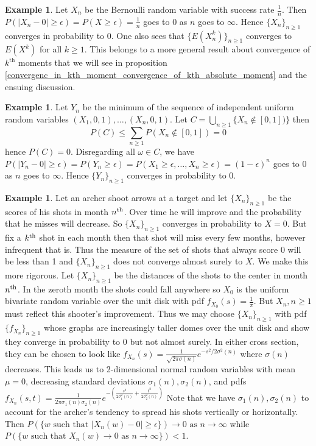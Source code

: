 \documentclass[12pt]{amsart}
\theoremstyle{definition}
\newtheorem{example}[theorem]{Example}
\begin{document}
\begin{example} \label{convergence_in_probability_1} Let $X_n$ be the Bernoulli random variable with success rate $\frac{1}{n}$.  Then $P(|X_n - 0| \geq \epsilon) = P(X \geq \epsilon) = \frac{1}{n}$ goes to 0 as $n$ goes to $\infty$. Hence $\{X_n\}_{n \geq 1}$ converges in probability to $0$. One also sees that $\{E(X_n^k)\}_{n \geq 1}$ converges to $E(X^k)$ for all $k \geq 1$. This belongs to a more general result about convergence of $k^{\text{th}}$ moments that we will see in proposition \ref{convergenc_in_kth_moment_convergence_of_kth_absolute_moment} and the ensuing discussion.
\end{example}
\begin{example} \label{convergence_in_probability_2} Let $Y_n$ be the minimum of the sequence of independent uniform random variables $(X_1, 0, 1), \dots , (X_n, 0, 1)$. Let $C = \bigcup\limits_{n \geq 1} \{X_n \nin [0,1])\}$ then
$$P(C) \leq \sum\limits_{n \geq 1} P(X_n \nin [0,1]) = 0$$
hence $P(C) = 0$. Disregarding all $\omega \in C$, we have $P(|Y_n - 0| \geq \epsilon) = P(Y_n \geq \epsilon) = P(X_1 \geq \epsilon, \dots , X_n \geq \epsilon) = (1-\epsilon)^n$ goes to $0$ as $n$ goes to $\infty$. Hence $\{Y_n\}_{n \geq 1}$ converges in probability to 0.
\end{example}
\begin{example} \label{archer} Let  an archer shoot arrows at a target and let $\{X_n\}_{n \geq 1}$ be the scores of his shots in month $n^{\textnormal{th}}$. Over time he will improve and the probability that he misses will decrease. So $\{X_n\}_{n \geq 1}$ converges in probability to $X = 0$. But fix a $k^{\textnormal{th}}$ shot in each month then that shot will miss every few months, however infrequent that is. Thus the measure of the set of shots that always score 0 will be less than 1 and $\{X_n\}_{n \geq 1}$ does not converge almost surely to $X$. We make this more rigorous. Let $\{X_n\}_{n \geq 1}$ be the distances of the shots to the center in month $n^{\textnormal{th}}$. In the zeroth month the shots could fall anywhere so $X_0$ is the uniform bivariate random variable over the unit disk with pdf $f_{X_0}(s) = \frac{1}{\pi}$. But $X_n, n \geq 1$ must reflect this shooter's improvement. Thus we may choose $\{X_n\}_{n \geq 1}$ with pdf $\{f_{X_n}\}_{n \geq 1}$ whose graphs are increasingly taller domes over the unit disk and show they converge in probability to 0 but not almost surely. In either cross section, they can be chosen to look like $f_{X_n}(s) = \frac{1}{\sqrt{2\pi\sigma(n)}}e^{- s^2/2\sigma^2(n)}$ where $\sigma(n)$ decreases. This leads us to 2-dimensional normal random variables with mean $\mu = 0$,  decreasing standard deviations $\sigma_1(n), \sigma_2(n)$, and pdfs $f_{X_n} (s, t) = \frac{1}{2\pi\sigma_1(n)\sigma_2(n)}e^{- \left( \frac{s^2}{2\sigma_1^2(n)} + \frac{t^2}{2\sigma_2^2(n)} \right)}$  Note that we have $\sigma_1(n), \sigma_2(n)$ to account for the archer's tendency to spread his shots vertically or horizontally. Then $P(\{w \text{ such that } |X_n(w) - 0| \geq \epsilon \} ) \rightarrow 0 \text{ as } n \rightarrow \infty$ while $P(\{w \text{ such that } X_n(w) \rightarrow 0 \text{ as } n \rightarrow \infty\}) < 1$.
\end{example}
\end{document}
